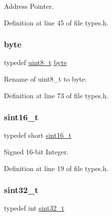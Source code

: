Address Pointer. 



Definition at line 45 of file types.\+h.

\mbox{\label{a00104_ab8ef12fab634c171394422d0ee8baf94_ab8ef12fab634c171394422d0ee8baf94}} 
\subsubsection{\texorpdfstring{byte}{byte}}
{\footnotesize\ttfamily typedef \hyperlink{a00104_aba7bc1797add20fe3efdf37ced1182c5_aba7bc1797add20fe3efdf37ced1182c5}{uint8\+\_\+t} \hyperlink{a00104_ab8ef12fab634c171394422d0ee8baf94_ab8ef12fab634c171394422d0ee8baf94}{byte}}



Rename of uint8\+\_\+t to byte. 



Definition at line 73 of file types.\+h.

\mbox{\label{a00104_a5881659ed80e940350d12831204375cd_a5881659ed80e940350d12831204375cd}} 
\subsubsection{\texorpdfstring{sint16\+\_\+t}{sint16\_t}}
{\footnotesize\ttfamily typedef short \hyperlink{a00104_a5881659ed80e940350d12831204375cd_a5881659ed80e940350d12831204375cd}{sint16\+\_\+t}}



Signed 16-\/bit Integer. 



Definition at line 19 of file types.\+h.

\mbox{\label{a00104_ad838970452fe561cb8e0550cac5336be_ad838970452fe561cb8e0550cac5336be}} 
\subsubsection{\texorpdfstring{sint32\+\_\+t}{sint32\_t}}
{\footnotesize\ttfamily typedef int \hyperlink{a00104_ad838970452fe561cb8e0550cac5336be_ad838970452fe561cb8e0550cac5336be}{sint32\+\_\+t}}



